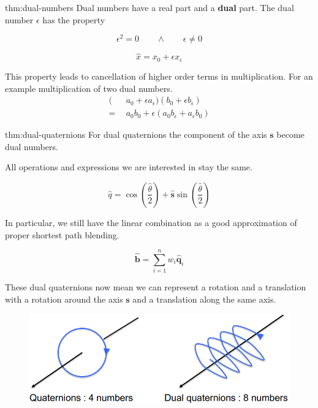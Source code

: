 \documentclass{article}
\begin{document}
\begin{defin}{thm:dual-numbers}
    Dual numbers have a real part and a \textbf{dual} part. The dual number \(\epsilon\) has the property

    \[
        \epsilon^2 = 0 \qquad \wedge \qquad \epsilon \neq 0
    \]

    \vspace{-10px}

    \[
        \hat{x} = x_0 + \epsilon x_\epsilon
    \]

    This property leads to cancellation of higher order terms in multiplication. For an example 
    multiplication of two dual numbers.
    \begin{align*}
        (&a_0 + \epsilon a_\epsilon)(b_0 + \epsilon b_\epsilon) \\
        = \ \ &a_0b_0 + \epsilon(a_0 b_\epsilon + a_\epsilon b_0)
    \end{align*}
\end{defin}

\begin{defin}{thm:dual-quaternions}
    For dual quaternions the component of the axis \(\mathbf{s}\) become dual numbers.

    \vspace{5px}

    All operations and expressions we are interested in stay the same.

    \[
        \hat{q} = \cos \left(\frac{\hat{\theta}}{2}\right) + \mathbf{\hat{s}} \sin\left(\frac{\hat{\theta}}{2}\right)
    \]

    In particular, we still have the linear combination as a good approximation of proper shortest path
    blending.

    \[
        \mathbf{\hat{b}} = \sum_{i=1}^{n} w_i \mathbf{\hat{q}}_i
    \]
\end{defin}

These dual quaternions now mean we can represent a rotation and a translation with a rotation around the axis
\(\mathbf{s}\) and a translation along the same axis.

\begin{figure}[!ht]
    \centering
    \includegraphics[width=0.4\linewidth]{images/dual_quaternions_vs_quaternions.png}
\end{figure}
\end{document}
